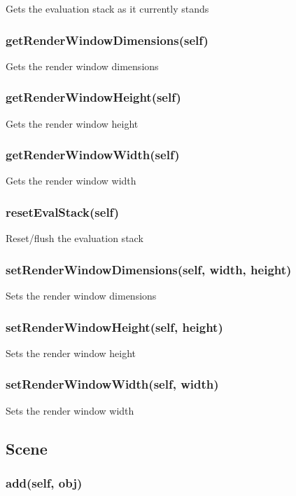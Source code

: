 Gets the evaluation stack as it currently stands

\subsubsection{getRenderWindowDimensions(self)}

Gets the render window dimensions

\subsubsection{getRenderWindowHeight(self)}

Gets the render window height

\subsubsection{getRenderWindowWidth(self)}

Gets the render window width

\subsubsection{resetEvalStack(self)}

Reset/flush the evaluation stack

\subsubsection{setRenderWindowDimensions(self, width, height)}

Sets the render window dimensions

\subsubsection{setRenderWindowHeight(self, height)}

Sets the render window height

\subsubsection{setRenderWindowWidth(self, width)}

Sets the render window width

\subsection{Scene}

\subsubsection{add(self, obj)}

